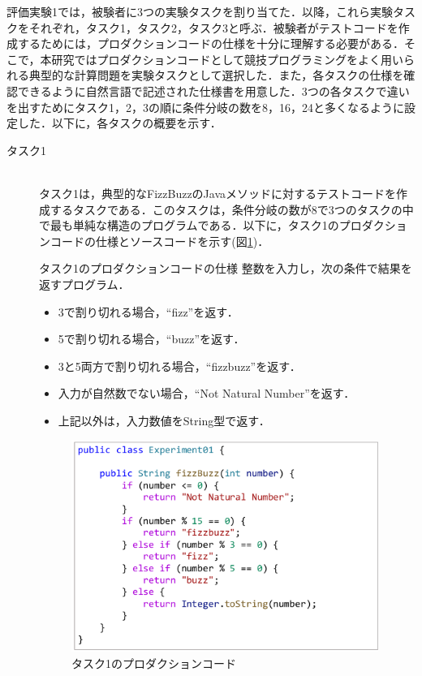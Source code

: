\documentclass[12pt]{jarticle} %
\begin{document}
評価実験1では，被験者に3つの実験タスクを割り当てた．以降，これら実験タスクをそれぞれ，タスク1，タスク2，タスク3と呼ぶ．被験者がテストコードを作成するためには，プロダクションコードの仕様を十分に理解する必要がある．そこで，本研究ではプロダクションコードとして競技プログラミングをよく用いられる典型的な計算問題を実験タスクとして選択した．また，各タスクの仕様を確認できるように自然言語で記述された仕様書を用意した．3つの各タスクで違いを出すためにタスク1，2，3の順に条件分岐の数を8，16，24と多くなるように設定した．以下に，各タスクの概要を示す．

\begin{description}
\item[タスク1]~\\
タスク1は，典型的なFizzBuzzのJavaメソッドに対するテストコードを作成するタスクである．このタスクは，条件分岐の数が8で3つのタスクの中で最も単純な構造のプログラムである．以下に，タスク1のプロダクションコードの仕様とソースコードを示す(図\ref{E1})．

\begin{itembox}[l]{タスク1のプロダクションコードの仕様}
整数を入力し，次の条件で結果を返すプログラム．
\begin{itemize}
\item 3で割り切れる場合，``fizz''を返す．
\item 5で割り切れる場合，``buzz''を返す．
\item 3と5両方で割り切れる場合，``fizzbuzz''を返す．
\item 入力が自然数でない場合，``Not Natural Number''を返す．
\item 上記以外は，入力数値をString型で返す．
\end{itemize}
\end{itembox}

\begin{figure}[h]
\begin{center}
\includegraphics[clip,width=10cm]{image/E1.pdf}
\caption{タスク1のプロダクションコード}
\label{E1}
\end{center}
\end{figure}


\end{description}
\end{document}
